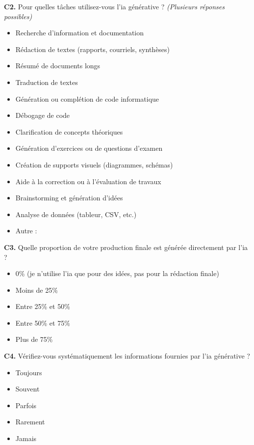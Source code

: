 \textbf{C2.} Pour quelles tâches utilisez-vous l'\gls{ia} générative ? \textit{(Plusieurs réponses possibles)}
\begin{itemize}[label=$\square$, leftmargin=1.5cm]
  \item Recherche d'information et documentation
  \item Rédaction de textes (rapports, courriels, synthèses)
  \item Résumé de documents longs
  \item Traduction de textes
  \item Génération ou complétion de code informatique
  \item Débogage de code
  \item Clarification de concepts théoriques
  \item Génération d'exercices ou de questions d'examen
  \item Création de supports visuels (diagrammes, schémas)
  \item Aide à la correction ou à l'évaluation de travaux
  \item Brainstorming et génération d'idées
  \item Analyse de données (tableur, CSV, etc.)
  \item Autre : \underline{\hspace{4cm}}
\end{itemize}

\textbf{C3.} Quelle proportion de votre production finale est générée directement par l'\gls{ia} ?
\begin{itemize}[label=$\square$, leftmargin=1.5cm]
  \item 0\% (je n'utilise l'\gls{ia} que pour des idées, pas pour la rédaction finale)
  \item Moins de 25\%
  \item Entre 25\% et 50\%
  \item Entre 50\% et 75\%
  \item Plus de 75\%
\end{itemize}

\textbf{C4.} Vérifiez-vous systématiquement les informations fournies par l'\gls{ia} générative ?
\begin{itemize}[label=$\square$, leftmargin=1.5cm]
  \item Toujours
  \item Souvent
  \item Parfois
  \item Rarement
  \item Jamais
\end{itemize}

